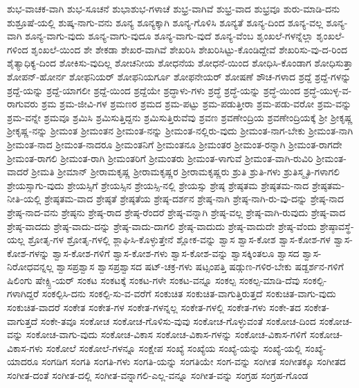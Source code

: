 {ಶುಭ-ವಾಚಕ-ವಾಗಿ
ಶುಭ-ಸೂಚನೆ
ಶುಭಾಶುಭ-ಗಳಾಚೆ
ಶುಭ್ರ-ವಾಗಿವೆ
ಶುಭ್ರ-ವಾದ
ಶುಭ್ರವೂ
ಶುರು-ಮಾಡಿ-ದನು
ಶುಶ್ರೂಷೆ-ಯಲ್ಲಿ
ಶುಷ್ಕ-ನಾಗು-ವನು
ಶೂನ್ಯ
ಶೂನ್ಯಕ್ಕಾಗಿ
ಶೂನ್ಯ-ಗೊಳಿಸಿ
ಶೂನ್ಯತೆ
ಶೂನ್ಯ-ದಿಂದ
ಶೂನ್ಯ-ವಲ್ಲ
ಶೂನ್ಯ-ವಾಗಿ
ಶೂನ್ಯ-ವಾಗು-ವುದು
ಶೂನ್ಯ-ವಾಗು-ವುದೂ
ಶೂನ್ಯ-ವಾಗು-ವುದೆ
ಶೂನ್ಯ-ವೆಂಬ
ಶೃಂಖಲೆ-ಗಳನ್ನೆಲ್ಲಾ
ಶೃಂಖಲೆ-ಗಳಿಂದ
ಶೃಂಖಲೆ-ಯಿಂದ
ಶೇ
ಶೇಕಡಾ
ಶೇಖರ-ವಾಗಿವೆ
ಶೇಖರಿಸಿ
ಶೇಖರಿಸಿಟ್ಟು-ಕೊಂಡಿದ್ದೇವೆ
ಶೇಖರಿಸು-ವು-ದ-ರಿಂದ
ಶೈತ್ಯಾಧಿಕ್ಯ-ದಿಂದ
ಶೋಕಿಸು-ವುದಿಲ್ಲ
ಶೋಚನೀಯ
ಶೋಧನೆಯ
ಶೋಧನೆ-ಯಿಂದ
ಶೋಧಿಸಿ-ಕೊಂಡಾಗ
ಶೋಧಿಸುತ್ತಾ
ಶೋಪನ್-ಹೋರ್ನ
ಶೋಫನಿಯರ್
ಶೋಫನಿಯರ್ಗೂ
ಶೋಫನೇಯರ್
ಶೋಷಣೆ
ಶೌಚ-ಗಳಾದ
ಶ್ರದ್ದೆ
ಶ್ರದ್ದೆ-ಗಳನ್ನು
ಶ್ರದ್ದೆ-ಯನ್ನು
ಶ್ರದ್ದೆ-ಯಾಗಲೀ
ಶ್ರದ್ದೆ-ಯಿಂದ
ಶ್ರದ್ದೆಯೇ
ಶ್ರದ್ಧಾಳು-ಗಳು
ಶ್ರದ್ಧೆ
ಶ್ರದ್ಧೆ-ಯನ್ನು
ಶ್ರದ್ಧೆ-ಯಿಂದ
ಶ್ರದ್ಧೆ-ಯುಳ್ಳ-ವ-ರಾಗುವರು
ಶ್ರಮ
ಶ್ರಮ-ಜೀವಿ-ಗಳ
ಶ್ರಮಣರ
ಶ್ರಮದ
ಶ್ರಮ-ಪಟ್ಟು
ಶ್ರಮ-ಪಡುತ್ತೀರಾ
ಶ್ರಮ-ಪಡು-ವರೋ
ಶ್ರಮ-ವನ್ನು
ಶ್ರಮ-ವನ್ನೇ
ಶ್ರಮವೂ
ಶ್ರಮಿಸಿ
ಶ್ರಮಿಸುತ್ತಿದ್ದನು
ಶ್ರಮಿಸುತ್ತಿರುವೆವು
ಶ್ರವಣ
ಶ್ರವಣೇಂದ್ರಿಯ
ಶ್ರವಣೇಂದ್ರಿಯಕ್ಕೆ
ಶ್ರೀ
ಶ್ರೀಕೃಷ್ಣ
ಶ್ರೀಕೃಷ್ಣ-ನನ್ನು
ಶ್ರೀಮಂತ
ಶ್ರೀಮಂತನ
ಶ್ರೀಮಂತ-ನನ್ನು
ಶ್ರೀಮಂತ-ನಲ್ಲಿರು-ವುದು
ಶ್ರೀಮಂತ-ನಾಗ-ಬೇಕು
ಶ್ರೀಮಂತ-ನಾಗಿ
ಶ್ರೀಮಂತ-ನಾದ
ಶ್ರೀಮಂತ-ನಾದರೂ
ಶ್ರೀಮಂತನಿಗೆ
ಶ್ರೀಮಂತನೂ
ಶ್ರೀಮಂತರ
ಶ್ರೀಮಂತ-ರನ್ನಾಗಿ
ಶ್ರೀಮಂತ-ರಾಗದೇ
ಶ್ರೀಮಂತ-ರಾಗಲಿ
ಶ್ರೀಮಂತ-ರಾಗಿ
ಶ್ರೀಮಂತರಿಗೆ
ಶ್ರೀಮಂತರು
ಶ್ರೀಮಂತ-ಳಾಗುವೆ
ಶ್ರೀಮಂತ-ವಾಗಿ-ರುವಿರಿ
ಶ್ರೀಮಂತ-ವಾದರೆ
ಶ್ರೀಮತಿ
ಶ್ರೀಮಾನ್
ಶ್ರೀರಾಮಕೃಷ್ಣ
ಶ್ರೀರಾಮಕೃಷ್ಣರ
ಶ್ರೀರಾಮಕೃಷ್ಣರು
ಶ್ರುತಿ
ಶ್ರುತಿ-ಗಳು
ಶ್ರುತಿಸ್ಮೃತಿ-ಗಳಾಗಲಿ
ಶ್ರೇಯಸ್ಸಾಗು-ವುದು
ಶ್ರೇಯಸ್ಸಿಗೆ
ಶ್ರೇಯಸ್ಸಿನ
ಶ್ರೇಯಸ್ಸಿ-ನಲ್ಲಿ
ಶ್ರೇಯಸ್ಸು
ಶ್ರೇಷ್ಠ
ಶ್ರೇಷ್ಠತಮ
ಶ್ರೇಷ್ಠತಮ-ನಾದ
ಶ್ರೇಷ್ಠತಮ-ನೀತಿ-ಯಲ್ಲಿ
ಶ್ರೇಷ್ಠತಮ-ವಾದ
ಶ್ರೇಷ್ಠತೆ
ಶ್ರೇಷ್ಠತೆಯ
ಶ್ರೇಷ್ಠ-ದರ್ಶನ
ಶ್ರೇಷ್ಠ-ನಾಗಿ
ಶ್ರೇಷ್ಠ-ನಾಗಿ-ರು-ವು-ದನ್ನು
ಶ್ರೇಷ್ಠ-ನಾದ
ಶ್ರೇಷ್ಠ-ನಾದ-ವನು
ಶ್ರೇಷ್ಠನು
ಶ್ರೇಷ್ಠ-ರಾದ
ಶ್ರೇಷ್ಠ-ರೆಂದರೆ
ಶ್ರೇಷ್ಠ-ವನ್ನಾಗಿ
ಶ್ರೇಷ್ಠ-ವಲ್ಲ
ಶ್ರೇಷ್ಠ-ವಾಗಿ-ರುವುದು
ಶ್ರೇಷ್ಠ-ವಾದ
ಶ್ರೇಷ್ಠ-ವಾದದು
ಶ್ರೇಷ್ಠ-ವಾದು-ದನ್ನು
ಶ್ರೇಷ್ಠ-ವಾದು-ದಾಗಲಿ
ಶ್ರೇಷ್ಠ-ವಾದುದು
ಶ್ರೇಷ್ಠ-ವಾದುದೇ
ಶ್ರೇಷ್ಠ-ವೆಂದು
ಶ್ರೇಷ್ಠಾವಸ್ಥೆ-ಯಲ್ಲ
ಶ್ರೋತೃ-ಗಳ
ಶ್ರೋತೃ-ಗಳಲ್ಲಿ
ಶ್ಲಾಘಿಸಿ-ಕೊಳ್ಳುತ್ತೇನೆ
ಶ್ಲೋಕ-ವನ್ನು
ಶ್ವಾಸ
ಶ್ವಾಸ-ಕೋಶ
ಶ್ವಾಸ-ಕೋಶ-ಗಳ
ಶ್ವಾಸ-ಕೋಶ-ಗಳನ್ನು
ಶ್ವಾಸ-ಕೋಶ-ಗಳಿಗೆ
ಶ್ವಾಸ-ಕೋಶ-ಗಳು
ಶ್ವಾಸ-ಕೋಶ-ವನ್ನು
ಶ್ವಾಸಕ್ಕಿಂತಲೂ
ಶ್ವಾಸದ
ಶ್ವಾಸ-ನಿರೋಧವನ್ನಲ್ಲ
ಶ್ವಾಸಪ್ರಶ್ವಾಸ
ಶ್ವಾಸಪ್ರಶ್ವಾಸದ
ಷಟ್-ಚಕ್ರ-ಗಳು
ಷಟ್ಸಂಪತ್ತಿ
ಷಡ್ಗುಣ-ಗಳಿರ-ಬೇಕು
ಷಡ್ದರ್ಶನ-ಗಳಿಗೆ
ಷಿಲಿಂಗು
ಷೇಕ್ಸ್ಪಿ-ಯರ್
ಸಂಕಟ
ಸಂಕಟಕ್ಕೆ
ಸಂಕಟ-ಗಳೇ
ಸಂಕಟ-ವನ್ನೂ
ಸಂಕಲ್ಪ
ಸಂಕಲ್ಪ-ಮಾಡಿ-ದೆವು
ಸಂಕಲ್ಪಿ-ಗಳಾಗಿದ್ದರೆ
ಸಂಕಲ್ಪಿಸಿ-ದನು
ಸಂಕಲ್ಪಿ-ಸು-ವ-ವರೆಗೆ
ಸಂಕುಚಿತ
ಸಂಕುಚಿತ-ವಾಗುತ್ತಿರುತ್ತದೆ
ಸಂಕುಚಿತ-ವಾಗು-ವುದು
ಸಂಕುಚಿತ-ವಾದರೆ
ಸಂಕೇತ
ಸಂಕೇತ-ಗಳ
ಸಂಕೇತ-ಗಳನ್ನಲ್ಲ
ಸಂಕೇತ-ಗಳಲ್ಲಿ
ಸಂಕೇತ-ಗಳು
ಸಂಕೇ-ತದ
ಸಂಕೇತ-ವಾಗುತ್ತದೆ
ಸಂಕೇ-ತವೂ
ಸಂಕೋಚ
ಸಂಕೋಚ-ಗೊಳಿಸು-ವುವು
ಸಂಕೋಚ-ಗೊಳ್ಳುವಂತೆ
ಸಂಕೋಚ-ದಿಂದ
ಸಂಕೋಚ-ವನ್ನು
ಸಂಕೋಚ-ವಾಗು-ವುದು
ಸಂಕೋಚ-ವಿಕಾಸ
ಸಂಕೋಚ-ವಿಕಾಸ-ಗಳನ್ನು
ಸಂಕೋಚ-ವಿಕಾಸ-ಗಳಿಗೆ
ಸಂಕೋಚ-ವಿಕಾಸ-ಗಳು
ಸಂಕೋಲೆ
ಸಂಕೋಲೆ-ಗಳನ್ನೂ
ಸಂಕ್ಷೇಪ
ಸಂಖ್ಯೆ
ಸಂಖ್ಯೆಯ
ಸಂಖ್ಯೆ-ಯನ್ನು
ಸಂಖ್ಯೆ-ಯಲ್ಲಿ
ಸಂಖ್ಯೆ-ಯಾದರೂ
ಸಂಗಡಿಗ
ಸಂಗತಿ
ಸಂಗತಿ-ಗಳು
ಸಂಗತಿ-ಯನ್ನು
ಸಂಗತಿಯೇ
ಸಂಗ-ವನ್ನು
ಸಂಗೀತ
ಸಂಗೀತಕ್ಕೂ
ಸಂಗೀತದ
ಸಂಗೀತ-ದಂತೆ
ಸಂಗೀತ-ದಲ್ಲಿ
ಸಂಗೀತ-ವನ್ನಾಗಲಿ-ಎಲ್ಲ-ವನ್ನೂ
ಸಂಗೀತ-ವನ್ನು
ಸಂಗ್ರಹ
ಸಂಗ್ರಹ-ಗೊಂಡ
}
